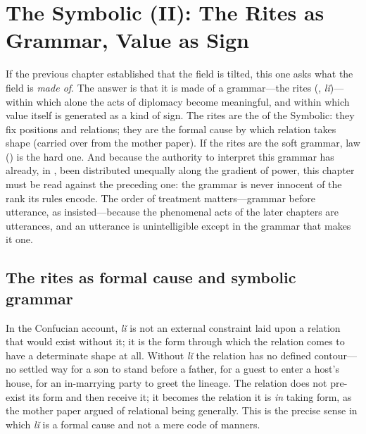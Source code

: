 \section{The Symbolic (II): The Rites as Grammar, Value as Sign}\label{p07:sec:rite}

If the previous chapter established that the field is tilted, this one asks what the field is \emph{made of}. The answer is that it is made of a grammar---the rites (, \emph{lǐ})---within which alone the acts of diplomacy become meaningful, and within which value itself is generated as a kind of sign. The rites are the  of the Symbolic: they fix positions and relations; they are the formal cause by which relation takes shape (carried over from the mother paper). If the rites are the soft grammar, law () is the hard one. And because the authority to interpret this grammar has already, in , been distributed unequally along the gradient of power, this chapter must be read against the preceding one: the grammar is never innocent of the rank its rules encode. The order of treatment matters---grammar before utterance, as  insisted---because the phenomenal acts of the later chapters are utterances, and an utterance is unintelligible except in the grammar that makes it one.

\subsection{The rites as formal cause and symbolic grammar}
In the Confucian account, \emph{lǐ} is not an external constraint laid upon a relation that would exist without it; it is the form through which the relation comes to have a determinate shape at all. Without \emph{lǐ} the relation has no defined contour---no settled way for a son to stand before a father, for a guest to enter a host's house, for an in-marrying party to greet the lineage. The relation does not pre-exist its form and then receive it; it becomes the relation it is \emph{in} taking form, as the mother paper argued of relational being generally. This is the precise sense in which \emph{lǐ} is a formal cause and not a mere code of manners.

